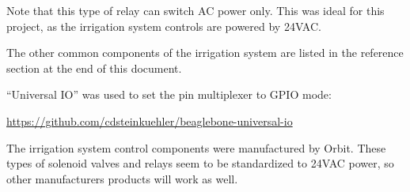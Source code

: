 Note that this type of relay can switch AC power only.  This was ideal for this 
project, as the irrigation system controls are powered by 24VAC.

The other common components of the irrigation system are listed in the 
reference section at the end of this document.

``Universal IO'' was used to set the pin multiplexer to GPIO mode:

\url{https://github.com/cdsteinkuehler/beaglebone-universal-io}

The irrigation system control components were manufactured by Orbit.  These 
types of solenoid valves and relays seem to be standardized to 24VAC power, so 
other manufacturers products will work as well.




